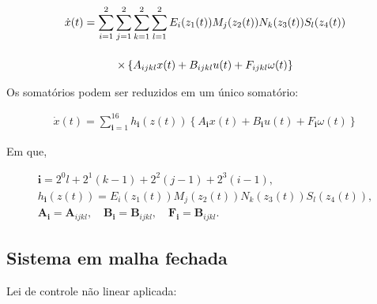 



\begin{gather}
  \dot{x}(t) =
  \sum\limits_{i=1}^{2} \sum\limits_{j=1}^{2} \sum\limits_{k=1}^{2} \sum\limits_{l=1}^{2} E_i(z_1(t))M_j(z_2(t))N_k(z_3(t))S_l(z_4(t))
  \notag \\[12pt] \times
  \left\{
  A_{ijkl}x(t) + B_{ijkl}u(t) + F_{ijkl}\omega(t)
  \right\}
\end{gather}

Os somatórios podem ser reduzidos em um único somatório:

\begin{gather}
  \dot{x}(t) =
  \sum\limits_{\mathbf{i}=1}^{16} h_{\mathbf{i}}(z(t))\left\{ A_{\mathbf{i}}x(t) + B_{\mathbf{i}}u(t) + F_{\mathbf{i}}\omega(t)\right\}
\end{gather}

Em que,


\begin{gather*}
  \mathbf{i}=2^0l+2^1(k-1)+2^2(j-1)+2^3(i-1), \\
  h_\mathbf{i}(z(t))=E_i\left(z_1(t)\right) M_j\left(z_2(t)\right) N_k\left(z_3(t)\right) S_l\left(z_4(t)\right), \\
  \boldsymbol{A}_\mathbf{i}=\boldsymbol{A}_{i j k l}, \quad \boldsymbol{B}_\mathbf{i}=\boldsymbol{B}_{i j k l}, \quad \boldsymbol{F}_\mathbf{i}=\boldsymbol{B}_{i j k l} .
\end{gather*}

\subsection*{Sistema em malha fechada}
Lei de controle não linear aplicada:

